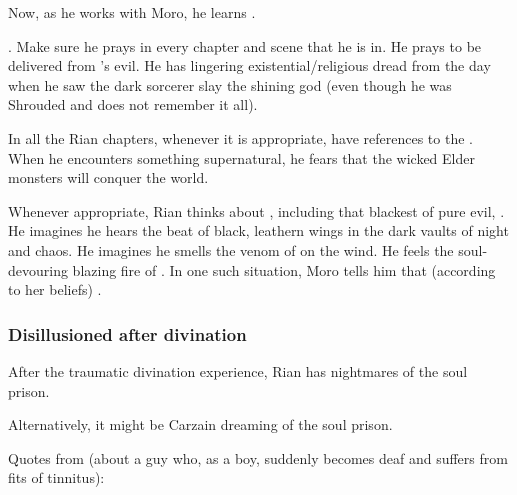 Now, as he works with Moro, he learns . 
    
.
Make sure he prays in every chapter and scene that he is in.
He prays to be delivered from \Isphet's evil. 
He has lingering existential/religious dread from the day when he saw the dark sorcerer slay the shining god (even though he was Shrouded and does not remember it all). 

In all the Rian chapters, whenever it is appropriate, have references to the . 
When he encounters something supernatural, he fears that the wicked Elder monsters will conquer the world. 

Whenever appropriate, Rian thinks about \dragons, including that blackest \dragon of pure evil, \Isphet.
He imagines he hears the beat of black, leathern wings in the dark vaults of night and chaos. 
He imagines he smells the venom of \dragons on the wind. 
He feels the soul-devouring blazing fire of \dragons. 
In one such situation, Moro tells him that (according to her beliefs) . 





\subsubsection{Disillusioned after divination}
After the traumatic divination experience, Rian has nightmares of the \Sephirah{} soul prison.

Alternatively, it might be Carzain dreaming of the \Malach{} soul prison. 

Quotes from \cite[Dread]{CliveBarker:BooksofBlood:II} (about a guy who, as a boy, suddenly becomes deaf and suffers from fits of tinnitus): 


